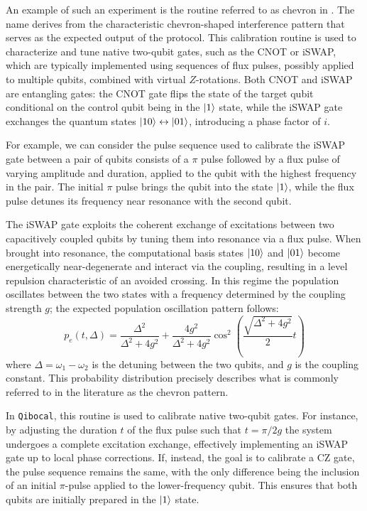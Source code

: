 An example of such an experiment is the routine referred to as chevron in \Qibocal. The name derives from the characteristic chevron-shaped interference pattern that serves as the expected output of the protocol.
This calibration routine is used to characterize and tune native two-qubit gates, such as the CNOT or iSWAP, which are typically implemented using sequences of flux pulses, possibly applied to multiple qubits, combined with virtual $Z$-rotations.
Both CNOT and iSWAP are entangling gates: the CNOT gate flips the state of the target qubit conditional on the control qubit being in the $\ket{1}$ state, while the iSWAP gate exchanges the quantum states $\ket{10} \leftrightarrow \ket{01}$, introducing a phase factor of $i$.

For example, we can consider the pulse sequence used to calibrate the iSWAP gate between a pair of qubits consists of a $\pi$ pulse followed by a flux pulse of varying amplitude and duration, applied to the qubit with the highest frequency in the pair. 
The initial $\pi$ pulse brings the qubit into the state $\ket{1}$, while the flux pulse detunes its frequency near resonance with the second qubit. 

The iSWAP gate exploits the coherent exchange of excitations between two capacitively coupled qubits by tuning them into resonance via a flux pulse. 
When brought into resonance, the computational basis states $\ket{10}$ and $\ket{01}$ become energetically near-degenerate and interact via the coupling, resulting in a level repulsion characteristic of an avoided crossing.
In this regime the population oscillates between the two states with a frequency determined by the coupling strength $g$; the expected population oscillation pattern follows:
\begin{equation}
    p_e(t, \Delta) = \frac{\Delta^2}{\Delta^2 + 4g^2} + \frac{4g^2}{\Delta^2 + 4g^2} \cos^2\left(\frac{\sqrt{\Delta^2 + 4g^2}}{2}t\right)
\end{equation}
where $\Delta = \omega_1 - \omega_2$ is the detuning between the two qubits, and $g$ is the coupling constant. This probability distribution precisely describes what is commonly referred to in the literature as the chevron pattern.

In \texttt{Qibocal}, this routine is used to calibrate native two-qubit gates. For instance, by adjusting the duration $t$ of the flux pulse such that $t = \pi/2g$ the system undergoes a complete excitation exchange, effectively implementing an iSWAP gate up to local phase corrections.  
If, instead, the goal is to calibrate a CZ gate, the pulse sequence remains the same, with the only difference being the inclusion of an initial $\pi$-pulse applied to the lower-frequency qubit. This ensures that both qubits are initially prepared in the $\ket{1}$ state.

